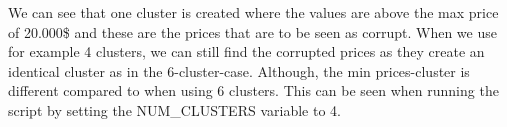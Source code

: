 \documentclass{article}
\begin{document}
        We can see that one cluster is created where the values are above the max price of 20.000\$ and these are the prices that are to be seen as corrupt. When we use for example 4 clusters, we can still find the corrupted prices as they create an identical cluster as in the 6-cluster-case. Although, the min prices-cluster is different compared to when using 6 clusters. This can be seen when running the script by setting the NUM\_CLUSTERS variable to 4.
\end{document}
